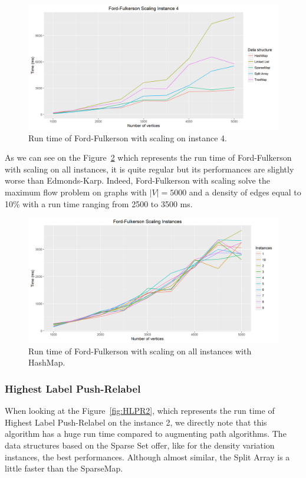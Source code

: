 \begin{figure}[H]
\includegraphics[scale=0.5]{images/FF4size.png}
\caption{Run time of Ford-Fulkerson with scaling on instance 4.}
\label{fig:FF4size}
\end{figure}

As we can see on the Figure~\ref{fig:FFmeansize} which represents the run time of Ford-Fulkerson with scaling on all instances, it is quite regular but its performances are slightly worse than Edmonds-Karp. Indeed, Ford-Fulkerson with scaling solve the maximum flow problem on graphs with $|V|=5000$ and a density of edges equal to 10\% with a run time ranging from 2500 to 3500 ms.

\begin{figure}[H]
\includegraphics[scale=0.5]{images/FFmeansize.png}
\caption{Run time of Ford-Fulkerson with scaling on all instances with HashMap.}
\label{fig:FFmeansize}
\end{figure}

\subsubsection{Highest Label Push-Relabel}

When looking at the Figure~\ref{fig:HLPR2}, which represents the run time of Highest Label Push-Relabel on the instance 2, we directly note that this algorithm has a huge run time compared to augmenting path algorithms. The data structures based on the Sparse Set offer, like for the density variation instances, the best performances. Although almost similar, the Split Array is a little faster than the SparseMap.

